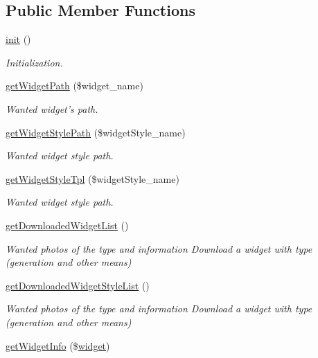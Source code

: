 \subsection*{Public Member Functions}
\begin{DoxyCompactItemize}
\item 
\hyperlink{classwidgetModel_a7bfe5611dc4916771b7ec2c148581f29}{init} ()
\begin{DoxyCompactList}\small\item\em Initialization. \end{DoxyCompactList}\item 
\hyperlink{classwidgetModel_a4d8d9f9e650ece12a4cfa4338d1a9cc5}{get\-Widget\-Path} (\$widget\-\_\-name)
\begin{DoxyCompactList}\small\item\em Wanted widget's path. \end{DoxyCompactList}\item 
\hyperlink{classwidgetModel_ae292d21337c4deb9ba7b4c0b4d794f0e}{get\-Widget\-Style\-Path} (\$widget\-Style\-\_\-name)
\begin{DoxyCompactList}\small\item\em Wanted widget style path. \end{DoxyCompactList}\item 
\hyperlink{classwidgetModel_a772aadab9c4dd23780bc3de738f63829}{get\-Widget\-Style\-Tpl} (\$widget\-Style\-\_\-name)
\begin{DoxyCompactList}\small\item\em Wanted widget style path. \end{DoxyCompactList}\item 
\hyperlink{classwidgetModel_a0035e5c87cd625a1f84d9b0a0f146e02}{get\-Downloaded\-Widget\-List} ()
\begin{DoxyCompactList}\small\item\em Wanted photos of the type and information Download a widget with type (generation and other means) \end{DoxyCompactList}\item 
\hyperlink{classwidgetModel_a417d153dcef8dd22eddd204fa0fde16f}{get\-Downloaded\-Widget\-Style\-List} ()
\begin{DoxyCompactList}\small\item\em Wanted photos of the type and information Download a widget with type (generation and other means) \end{DoxyCompactList}\item 
\hyperlink{classwidgetModel_a6e29e4176b458525680606cb376cbff1}{get\-Widget\-Info} (\$\hyperlink{classwidget}{widget})

\end{DoxyCompactItemize}

